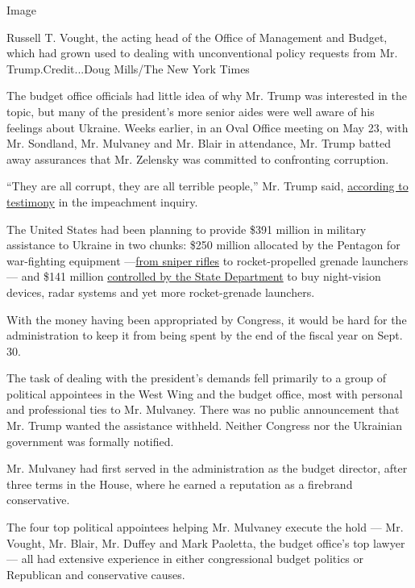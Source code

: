 Image

Russell T. Vought, the acting head of the Office of Management and
Budget, which had grown used to dealing with unconventional policy
requests from Mr. Trump.Credit...Doug Mills/The New York Times

The budget office officials had little idea of why Mr. Trump was
interested in the topic, but many of the president's more senior aides
were well aware of his feelings about Ukraine. Weeks earlier, in an Oval
Office meeting on May 23, with Mr. Sondland, Mr. Mulvaney and Mr. Blair
in attendance, Mr. Trump batted away assurances that Mr. Zelensky was
committed to confronting corruption.

``They are all corrupt, they are all terrible people,'' Mr. Trump said,
\href{https://www.nytimes.com/2019/11/19/us/politics/volker-statement-testimony.html}{according
to testimony} in the impeachment inquiry.

The United States had been planning to provide \$391 million in military
assistance to Ukraine in two chunks: \$250 million allocated by the
Pentagon for war-fighting equipment
---\href{https://www.defense.gov/Newsroom/Releases/Release/Article/1879340/dod-announces-250m-to-ukraine/}{from
sniper rifles} to rocket-propelled grenade launchers --- and \$141
million
\href{https://www.documentcloud.org/documents/6592555-Congressional-Notification-2019-FMF-Ukraine-115.html}{controlled
by the State Department} to buy night-vision devices, radar systems and
yet more rocket-grenade launchers.

With the money having been appropriated by Congress, it would be hard
for the administration to keep it from being spent by the end of the
fiscal year on Sept. 30.

The task of dealing with the president's demands fell primarily to a
group of political appointees in the West Wing and the budget office,
most with personal and professional ties to Mr. Mulvaney. There was no
public announcement that Mr. Trump wanted the assistance withheld.
Neither Congress nor the Ukrainian government was formally notified.

Mr. Mulvaney had first served in the administration as the budget
director, after three terms in the House, where he earned a reputation
as a firebrand conservative.

The four top political appointees helping Mr. Mulvaney execute the hold
--- Mr. Vought, Mr. Blair, Mr. Duffey and Mark Paoletta, the budget
office's top lawyer --- all had extensive experience in either
congressional budget politics or Republican and conservative causes.

